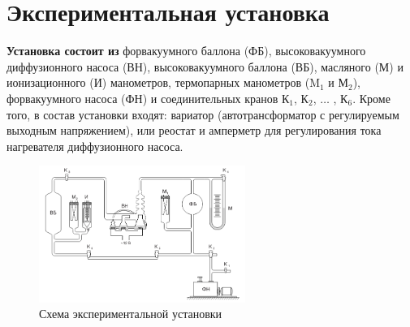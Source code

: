 \documentclass{article}
\newcommand{\x}{\text}
\newcommand{\bb}{\textbf}
\begin{document}

\section*{Экспериментальная установка}


\bb{Установка состоит из} форвакуумного баллона (ФБ), высоковакуумного диффузионного насоса (ВН), высоковакуумного баллона (ВБ), масляного (М) и ионизационного (И) манометров, термопарных манометров (M$_1$ и М$_2$), форвакуумного насоса (ФН) и соединительных кранов К$_1$, К$_2$, $\ldots$ , К$_6$. Кроме того, в состав установки входят: вариатор (автотрансформатор с регулируемым выходным напряжением), или реостат и амперметр для регулирования тока нагревателя диффузионного насоса.

\newpage

\begin{figure}[h!]
    \centering
    \includegraphics[width = 0.6\textwidth]{Screenshot from 2023-02-16 23-39-12.png}
    \caption{Схема экспериментальной установки}
    \label{pic1}
\end{figure}
\end{document}
